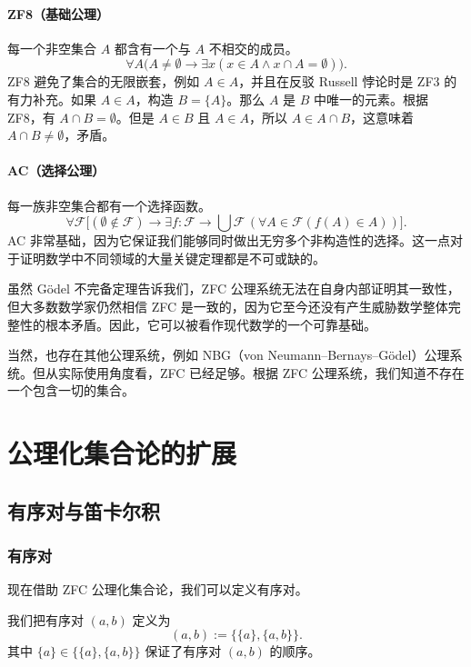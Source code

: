 \paragraph{ZF8（基础公理）}
每一个非空集合 $A$ 都含有一个与 $A$ 不相交的成员。
\[
\forall A\bigl(A\ne\emptyset\to \exists x(x\in A\wedge x\cap A=\emptyset)\bigr).
\]
ZF8 避免了集合的无限嵌套，例如 $A\in A$，并且在反驳 Russell 悖论时是 ZF3 的有力补充。如果 $A\in A$，构造 $B=\{A\}$。那么 $A$ 是 $B$ 中唯一的元素。根据 ZF8，有 $A\cap B=\emptyset$。但是 $A\in B$ 且 $A\in A$，所以 $A\in A\cap B$，这意味着 $A\cap B\ne\emptyset$，矛盾。

\paragraph{AC（选择公理）}
每一族非空集合都有一个选择函数。
\[
\forall \mathcal{F}\bigl[(\emptyset\notin \mathcal{F})\to \exists f:\mathcal{F}\to \bigcup\mathcal{F}\, (\forall A\in \mathcal{F}(f(A)\in A))\bigr].
\]
AC 非常基础，因为它保证我们能够同时做出无穷多个非构造性的选择。这一点对于证明数学中不同领域的大量关键定理都是不可或缺的。

虽然 Gödel 不完备定理告诉我们，ZFC 公理系统无法在自身内部证明其一致性，但大多数数学家仍然相信 ZFC 是一致的，因为它至今还没有产生威胁数学整体完整性的根本矛盾。因此，它可以被看作现代数学的一个可靠基础。

当然，也存在其他公理系统，例如 NBG（von Neumann--Bernays--Gödel）公理系统。但从实际使用角度看，ZFC 已经足够。根据 ZFC 公理系统，我们知道不存在一个包含一切的集合。

\section{公理化集合论的扩展}

\subsection{有序对与笛卡尔积}

\subsubsection{有序对}

现在借助 ZFC 公理化集合论，我们可以定义有序对。

\begin{definition}[有序对]
我们把有序对 $(a,b)$ 定义为
\[
(a,b):=\{\{a\},\{a,b\}\}.
\]
其中 $\{a\}\in \{\{a\},\{a,b\}\}$ 保证了有序对 $(a,b)$ 的顺序。
\end{definition}

